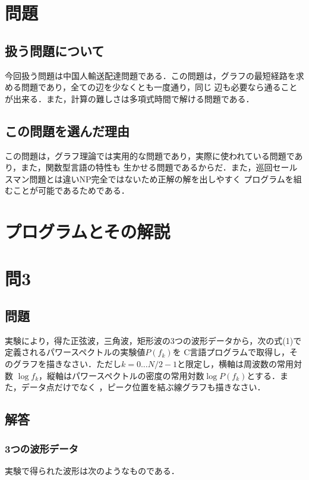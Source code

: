 
\section{問題} \label{sec:abstract}
\subsection{扱う問題について}
今回扱う問題は中国人輸送配達問題である．この問題は，グラフの最短経路を求める問題であり，全ての辺を少なくとも一度通り，同じ
辺も必要なら通ることが出来る．また，計算の難しさは多項式時間で解ける問題である．
\subsection{この問題を選んだ理由}
この問題は，グラフ理論では実用的な問題であり，実際に使われている問題であり，また，関数型言語の特性も
生かせる問題であるからだ．また，巡回セールスマン問題とは違いNP完全ではないため正解の解を出しやすく
プログラムを組むことが可能であるためである．

\section{プログラムとその解説} \label{sec:absatract}

    \section{問3} \label{sec:absatract}
\subsection{問題}
実験により，得た正弦波，三角波，矩形波の3つの波形データから，次の式(1)で定義されるパワースペクトルの実験値$P(f_k)$を
C言語プログラムで取得し，そのグラフを描きなさい．ただし$k=0...N/2-1$と限定し，横軸は周波数の常用対数
$\log f_k$，縦軸はパワースペクトルの密度の常用対数$\log P(f_k)$とする．また，データ点だけでなく
，ピーク位置を結ぶ線グラフも描きなさい．
\subsection{解答}
\subsubsection{3つの波形データ}
実験で得られた波形は次のようなものである．

